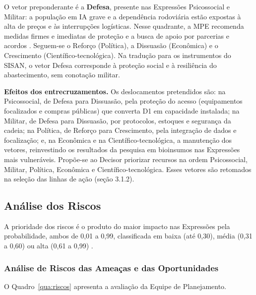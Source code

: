 \documentclass[
	12pt,				%
	openright,			%
	oneside,			%
	a4paper,			%
	chapter=TITLE,		%
	section=TITLE,		%
	english,			%
	french,				%
	spanish,			%
	brazil,				%
 ]{abntex2}
\begin{document}
O vetor preponderante é a \textbf{Defesa}, presente nas Expressões Psicossocial
e Militar: a população em IA grave e a dependência rodoviária estão expostas à
alta de preços e às interrupções logísticas. Nesse quadrante, a MPE recomenda
medidas firmes e imediatas de proteção e a busca de apoio por parcerias e
acordos \cite[p. 60]{esg_mpe2026}. Seguem-se o Reforço (Política), a Dissuasão
(Econômica) e o Crescimento (Científico-tecnológica). Na tradução para os
instrumentos do SISAN, o vetor Defesa corresponde à proteção social e à
resiliência do abastecimento, sem conotação militar.

\textbf{Efeitos dos entrecruzamentos.} Os deslocamentos pretendidos são: na
Psicossocial, de Defesa para Dissuasão, pela proteção do acesso (equipamentos
focalizados e compras públicas) que converta D1 em capacidade instalada; na
Militar, de Defesa para Dissuasão, por protocolos, estoques e segurança da cadeia;
na Política, de Reforço para Crescimento, pela integração de dados e
focalização; e, na Econômica e na Científico-tecnológica, a manutenção dos
vetores, reinvestindo os resultados da pesquisa em bioinsumos nas Expressões
mais vulneráveis. Propõe-se ao Decisor priorizar
recursos na ordem Psicossocial, Militar, Política, Econômica e
Científico-tecnológica. Esses vetores são retomados na seleção das linhas de
ação (seção 3.1.2).

\subsection{Análise dos Riscos}
A prioridade dos riscos é o produto do maior impacto nas Expressões pela
probabilidade, ambos de 0,01 a 0,99, classificada em baixa (até 0,30), média
(0,31 a 0,60) ou alta (0,61 a 0,99) \cite[p. 67--72]{esg_mpe2026}.

\subsubsection{Análise de Riscos das Ameaças e das Oportunidades}
O Quadro~\ref{qua:riscos} apresenta a avaliação da Equipe de Planejamento.
\end{document}
